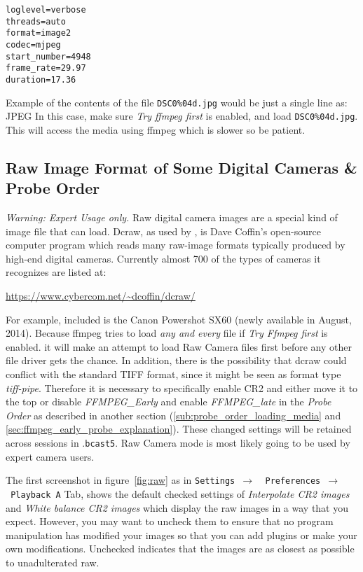 \begin{lstlisting}[style=sh,caption={Example
    DSC0\%04d.opts},captionpos=t]
loglevel=verbose
threads=auto
format=image2
codec=mjpeg 
start_number=4948
frame_rate=29.97
duration=17.36
\end{lstlisting}

Example of the contents of the file \texttt{DSC0\%04d.jpg} would be just a single line as:  JPEG
In this case, make sure \textit{Try ffmpeg first} is enabled, and load \texttt{DSC0\%04d.jpg}.  
This will access the media using ffmpeg which is slower so be patient.

\subsection{Raw Image Format of Some Digital Cameras \& Probe Order}%
\label{sub:raw_image_format_digital_camera_probe_order}

\textit{Warning: Expert Usage only.}  Raw digital camera images are a special kind of image file that \CGG{} can load. Dcraw, as used by \CGG{}, is Dave Coffin’s open-source computer program which reads many raw-image formats typically produced by high-end digital cameras.  Currently almost 700 of the types of cameras it recognizes are listed at:

\hspace{4em}	{\small \url{https://www.cybercom.net/~dcoffin/dcraw/}}

For example, included is the Canon Powershot SX60 (newly available in August, 2014).  Because ffmpeg tries to load \textit{any and every} file if \textit{Try Ffmpeg first} is enabled. it will make an attempt to load Raw Camera files first before any other file driver gets the chance.  In addition, there is the possibility that dcraw could conflict with the standard TIFF format, since it might be seen as format type \textit{tiff-pipe}.  Therefore it is necessary to specifically enable CR2 and either move it to the top or disable \textit{FFMPEG\_Early} and enable \textit{FFMPEG\_late} in the \textit{Probe Order} as described in another section (\ref{sub:probe_order_loading_media} and \ref{sec:ffmpeg_early_probe_explanation}).  These changed settings will be retained across \CGG{} sessions in .\texttt{bcast5}.  Raw Camera mode is most likely going to be used by expert camera users.

The first screenshot in figure~\ref{fig:raw} as in \texttt{Settings $\rightarrow$ ~Preferences $\rightarrow$ ~Playback A} Tab, shows the default checked settings of \textit{Interpolate CR2 images} and \textit{White balance CR2 images} which display the raw images in a way that you expect.  However, you may want to uncheck them to ensure that no program manipulation has modified your images so that you can add plugins or make your own modifications.  Unchecked indicates that the images are as closest as possible to unadulterated raw.

